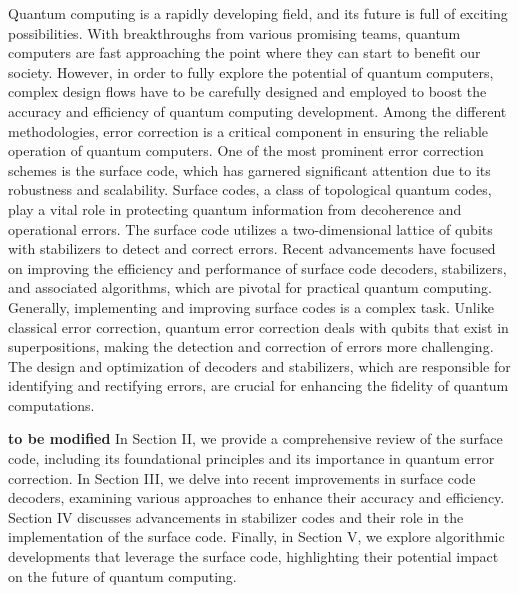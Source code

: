 Quantum computing is a rapidly developing field, and its future is full of exciting possibilities. With breakthroughs from various promising teams, quantum computers are fast approaching the point where they can start to benefit our society. However, in order to fully explore the potential of quantum computers, complex design flows have to be carefully designed and employed to boost the accuracy and efficiency of quantum computing development. Among the different methodologies, error correction is a critical component in ensuring the reliable operation of quantum computers. One of the most prominent error correction schemes is the surface code, which has garnered significant attention due to its robustness and scalability. Surface codes, a class of topological quantum codes, play a vital role in protecting quantum information from decoherence and operational errors. The surface code utilizes a two-dimensional lattice of qubits with stabilizers to detect and correct errors. Recent advancements have focused on improving the efficiency and performance of surface code decoders, stabilizers, and associated algorithms, which are pivotal for practical quantum computing. Generally, implementing and improving surface codes is a complex task. Unlike classical error correction, quantum error correction deals with qubits that exist in superpositions, making the detection and correction of errors more challenging. The design and optimization of decoders and stabilizers, which are responsible for identifying and rectifying errors, are crucial for enhancing the fidelity of quantum computations.

\textbf{to be modified}
In Section II, we provide a comprehensive review of the surface code, including its foundational principles and its importance in quantum error correction. In Section III, we delve into recent improvements in surface code decoders, examining various approaches to enhance their accuracy and efficiency. Section IV discusses advancements in stabilizer codes and their role in the implementation of the surface code. Finally, in Section V, we explore algorithmic developments that leverage the surface code, highlighting their potential impact on the future of quantum computing.